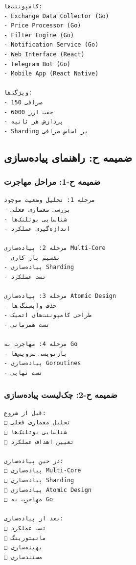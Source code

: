 \documentclass[
]{article}
\begin{document}
\begin{verbatim}
کامپوننت‌ها:
- Exchange Data Collector (Go)
- Price Processor (Go)
- Filter Engine (Go)
- Notification Service (Go)
- Web Interface (React)
- Telegram Bot (Go)
- Mobile App (React Native)

ویژگی‌ها:
- 150 صرافی
- 6000 جفت ارز
- پردازش هر ثانیه
- Sharding بر اساس صرافی
\end{verbatim}

\subsection{ضمیمه ح: راهنمای
پیاده‌سازی}\label{ux636ux645ux6ccux645ux647-ux62d-ux631ux627ux647ux646ux645ux627ux6cc-ux67eux6ccux627ux62fux647ux633ux627ux632ux6cc}

\subsubsection{ضمیمه ح-1: مراحل
مهاجرت}\label{ux636ux645ux6ccux645ux647-ux62d-1-ux645ux631ux627ux62dux644-ux645ux647ux627ux62cux631ux62a}

\begin{verbatim}
مرحله 1: تحلیل وضعیت موجود
- بررسی معماری فعلی
- شناسایی بوتلنک‌ها
- اندازه‌گیری عملکرد

مرحله 2: پیاده‌سازی Multi-Core
- تقسیم بار کاری
- پیاده‌سازی Sharding
- تست عملکرد

مرحله 3: پیاده‌سازی Atomic Design
- حذف وابستگی‌ها
- طراحی کامپوننت‌های اتمیک
- تست همزمانی

مرحله 4: مهاجرت به Go
- بازنویسی سرویس‌ها
- پیاده‌سازی Goroutines
- تست نهایی
\end{verbatim}

\subsubsection{ضمیمه ح-2: چک‌لیست
پیاده‌سازی}\label{ux636ux645ux6ccux645ux647-ux62d-2-ux686ux6a9ux644ux6ccux633ux62a-ux67eux6ccux627ux62fux647ux633ux627ux632ux6cc}

\begin{verbatim}
قبل از شروع:
□ تحلیل معماری فعلی
□ شناسایی بوتلنک‌ها
□ تعیین اهداف عملکرد

در حین پیاده‌سازی:
□ پیاده‌سازی Multi-Core
□ پیاده‌سازی Sharding
□ پیاده‌سازی Atomic Design
□ مهاجرت به Go

بعد از پیاده‌سازی:
□ تست عملکرد
□ مانیتورینگ
□ بهینه‌سازی
□ مستندسازی
\end{verbatim}
\end{document}
